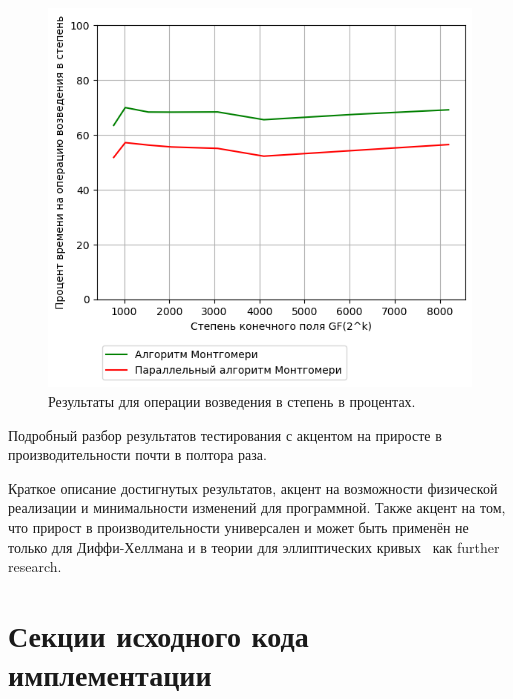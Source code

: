 \documentclass[times,specification,annotation]{itmo-student-thesis}
\begin{document}
\begin{figure}
\caption{Результаты для операции возведения в степень в процентах.}\label{fig:res_bignum_per}
\includegraphics{graphics/results_bignum_percent_ru.png}
\end{figure}

\chapterconclusion

Подробный разбор результатов тестирования с акцентом на приросте в производительности почти в полтора раза.

\startconclusionpage

Краткое описание достигнутых результатов, акцент на возможности физической реализации
и минимальности изменений для программной.
Также акцент на том, что прирост в производительности универсален и может быть применён не только для Диффи-Хеллмана
и в теории для эллиптических кривых~\cite{sta03} как further research.

\printmainbibliography


\appendix

\chapter{Секции исходного кода имплементации}\label{sec:app:1}
\end{document}
